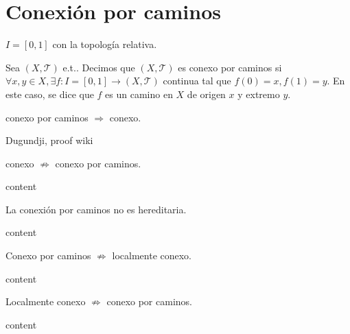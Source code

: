 \section{Conexión por caminos}

\begin{obs}
  $I = [0, 1]$ con la topología relativa.
\end{obs}

\begin{defn}
  Sea $( X, \mathcal{T} )$ e.t.. Decimos que $( X, \mathcal{T} ) $ es conexo por caminos si $\forall x, y \in X, \exists f : I = [0, 1] \to ( X, \mathcal{T} )$ continua tal que $f(0) = x, f(1) = y$. En este caso, se dice que $ f $ es un camino en $X$ de origen $x$ y extremo $y$.
\end{defn}

\begin{obs}
  conexo por caminos $\Rightarrow$ conexo.
\end{obs}

\begin{dem}
  Dugundji, proof wiki
\end{dem}

\begin{obs}
  conexo $\not \Rightarrow $ conexo por caminos.
\end{obs}

\begin{ejm}
  content
\end{ejm}

\begin{obs}
  La conexión por caminos no es hereditaria.
\end{obs}

\begin{ejm}
  content
\end{ejm}

\begin{obs}
  Conexo por caminos $\not \Rightarrow $ localmente conexo.
\end{obs}

\begin{ejm}
  content
\end{ejm}

\begin{obs}
  Localmente conexo $\not \Rightarrow$ conexo por caminos.
\end{obs}

\begin{ejm}
  content
\end{ejm}

